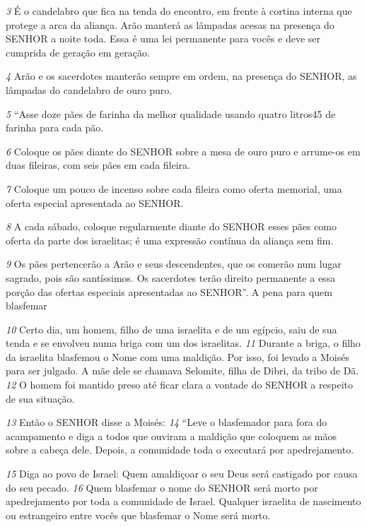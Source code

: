 \textit{\tiny 3} É o candelabro que fica na tenda do encontro, em
frente à cortina interna que protege a arca da aliança.
 Arão manterá as
lâmpadas acesas na presença do SENHOR a noite toda. Essa é uma lei permanente
para vocês e deve ser cumprida de geração em geração.
 
\textit{\tiny 4} Arão e os sacerdotes
manterão sempre em ordem, na presença do SENHOR, as lâmpadas do candelabro
de ouro puro.
   
\textit{\tiny 5} “Asse doze pães de farinha da melhor qualidade usando quatro litros45 de
farinha para cada pão.
 
\textit{\tiny 6} Coloque os pães diante do SENHOR sobre a mesa de ouro
puro e arrume-os em duas fileiras, com seis pães em cada fileira.
 
\textit{\tiny 7} Coloque um
pouco de incenso sobre cada fileira como oferta memorial, uma oferta especial
apresentada ao SENHOR.
 
\textit{\tiny 8} A cada sábado, coloque regularmente diante do SENHOR
esses pães como oferta da parte dos israelitas; é uma expressão contínua da
aliança sem fim.
 
\textit{\tiny 9} Os pães pertencerão a Arão e seus descendentes, que os
comerão num lugar sagrado, pois são santíssimos. Os sacerdotes terão direito
permanente a essa porção das ofertas especiais apresentadas ao SENHOR”.
A pena para quem blasfemar

\textit{\tiny 10}
Certo dia, um homem, filho de uma israelita e de um egípcio, saiu de sua tenda e
se envolveu numa briga com um dos israelitas. 
\textit{\tiny 11}
Durante a briga, o filho da
israelita blasfemou o Nome com uma maldição. Por isso, foi levado a Moisés para
ser julgado. A mãe dele se chamava Selomite, filha de Dibri, da tribo de Dã. 
\textit{\tiny 12}
O
homem foi mantido preso até ficar clara a vontade do SENHOR a respeito de sua
situação.
   
\textit{\tiny 13}
Então o SENHOR disse a Moisés: 
\textit{\tiny 14}
“Leve o blasfemador para fora do
acampamento e diga a todos que ouviram a maldição que coloquem as mãos
sobre a cabeça dele. Depois, a comunidade toda o executará por apedrejamento.

\textit{\tiny 15}
Diga ao povo de Israel: Quem amaldiçoar o seu Deus será castigado por causa
do seu pecado. 
\textit{\tiny 16}
Quem blasfemar o nome do SENHOR será morto por
apedrejamento por toda a comunidade de Israel. Qualquer israelita de
nascimento ou estrangeiro entre vocês que blasfemar o Nome será morto.
   

